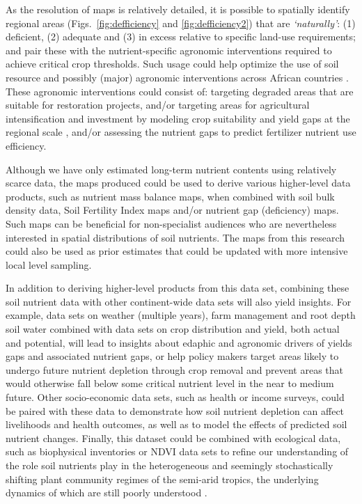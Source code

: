 \begin{linenumbers}
As the resolution of maps is relatively detailed, it is possible to spatially identify regional areas (Figs.\@~\ref{fig:defficiency} and \ref{fig:defficiency2}) that are \emph{`naturally'}: (1) deficient, (2) adequate and (3) in excess relative to specific land-use requirements; and pair these with the nutrient-specific agronomic interventions required to achieve critical crop thresholds. Such usage could help optimize the use of soil resource and possibly (major) agronomic interventions across African countries \citep{vanlauwe2014integrated}. These agronomic interventions could consist of: targeting degraded areas that are suitable for restoration projects, and/or targeting areas for agricultural intensification and investment by modeling crop suitability and yield gaps at the regional scale \citep{nijbroek2016regional}, and/or assessing the nutrient gaps to predict fertilizer nutrient use efficiency.  \par

Although we have only estimated long-term nutrient contents using relatively scarce data, the maps produced could be used to derive various higher-level data products, such as nutrient mass balance maps, when combined with soil bulk density data, Soil Fertility Index maps \citep{schaetzl2012taxonomically} and/or nutrient gap (deficiency) maps. Such maps can be beneficial for non-specialist audiences who are nevertheless interested in spatial distributions of soil nutrients. The maps from this research could also be used as prior estimates that could be updated with more intensive local level sampling. \par

In addition to deriving higher-level products from this data set, combining these soil nutrient data with other continent-wide data sets will also yield insights. For example, data sets on weather (multiple years), farm management and root depth soil water \citep{leenaars2015root} combined with data sets on crop distribution and yield, both actual and potential, will lead to insights about edaphic and agronomic drivers of yields gaps and associated nutrient gaps, or help policy makers target areas likely to undergo future nutrient depletion through crop removal and prevent areas that would otherwise fall below some critical nutrient level in the near to medium future. Other socio-economic data sets, such as health or income surveys, could be paired with these data to demonstrate how soil nutrient depletion can affect livelihoods and health outcomes, as well as to model the effects of predicted soil nutrient changes. Finally, this dataset could be combined with ecological data, such as biophysical inventories or NDVI data sets to refine our understanding of the role soil nutrients play in the heterogeneous and seemingly stochastically shifting plant community regimes of the semi-arid tropics, the underlying dynamics of which are still poorly understood \citep{murphy2012controls}.\par


\end{linenumbers}
